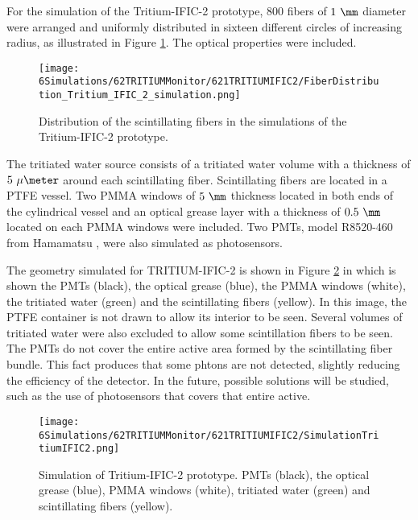 For the simulation of the Tritium-IFIC-2 prototype, $800$ fibers of $1~\mm$ diameter were arranged and uniformly distributed in sixteen different circles of increasing radius, as illustrated in Figure \ref{fig:FibersTritiumIFIC2Simulation}. The optical properties were included.

\begin{figure}[h]
\centering
\texttt{[image: 6Simulations/62TRITIUMMonitor/621TRITIUMIFIC2/FiberDistribution\_Tritium\_IFIC\_2\_simulation.png]}
\caption{Distribution of the scintillating fibers in the simulations of the Tritium-IFIC-2 prototype.\label{fig:FibersTritiumIFIC2Simulation}}
\end{figure}
The tritiated water source consists of a tritiated water volume with a thickness of $5~\mu\meter$ around each scintillating fiber. Scintillating fibers are located in a PTFE vessel. Two PMMA windows of $5~\mm$ thickness located in both ends of the cylindrical vessel and an optical grease layer with a thickness of $0.5~\mm$ located on each PMMA windows were included. Two PMTs, model R8520-460 from Hamamatsu \cite{DataSheetPMTs}, were also simulated as photosensors. 


The geometry simulated for TRITIUM-IFIC-2 is shown in Figure \ref{fig:TritiumIFIC2Simulation} in which is shown the PMTs (black), the optical grease (blue), the PMMA windows (white), the tritiated water (green) and the scintillating fibers (yellow). In this image, the PTFE container is not drawn to allow its interior to be seen. Several volumes of tritiated water were also excluded to allow some scintillation fibers to be seen. The PMTs do not cover the entire active area formed by the scintillating fiber bundle. This fact produces that some phtons are not detected, slightly reducing the efficiency of the detector. In the future, possible solutions will be studied, such as the use of photosensors that covers that entire active.

\begin{figure}[h]
\centering
\texttt{[image: 6Simulations/62TRITIUMMonitor/621TRITIUMIFIC2/SimulationTritiumIFIC2.png]}
\caption{Simulation of Tritium-IFIC-2 prototype. PMTs (black), the optical grease (blue), PMMA windows (white), tritiated water (green) and scintillating fibers (yellow). \label{fig:TritiumIFIC2Simulation}}
\end{figure}

